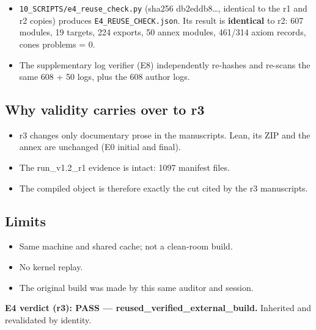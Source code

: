 \documentclass[
]{article}
\providecommand{\tightlist}{%
  \setlength{\itemsep}{0pt}\setlength{\parskip}{0pt}}
\begin{document}
\begin{itemize}
\tightlist
\item
  \texttt{10\_SCRIPTS/e4\_reuse\_check.py} (sha256 db2eddb8\ldots,
  identical to the r1 and r2 copies) produces
  \texttt{E4\_REUSE\_CHECK.json}. Its result is \textbf{identical} to
  r2: 607 modules, 19 targets, 224 exports, 50 annex modules, 461/314
  axiom records, cones problems = 0.
\item
  The supplementary log verifier (E8) independently re-hashes and
  re-scans the same 608 + 50 logs, plus the 608 author logs.
\end{itemize}

\subsection{Why validity carries over to
r3}\label{why-validity-carries-over-to-r3}

\begin{itemize}
\tightlist
\item
  r3 changes only documentary prose in the manuscripts. Lean, its ZIP
  and the annex are unchanged (E0 initial and final).
\item
  The run\_v1.2\_r1 evidence is intact: 1097 manifest files.
\item
  The compiled object is therefore exactly the cut cited by the r3
  manuscripts.
\end{itemize}

\subsection{Limits}\label{limits}

\begin{itemize}
\tightlist
\item
  Same machine and shared cache; not a clean-room build.
\item
  No kernel replay.
\item
  The original build was made by this same auditor and session.
\end{itemize}

\textbf{E4 verdict (r3): PASS --- reused\_verified\_external\_build.}
Inherited and revalidated by identity.
\end{document}
